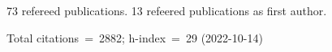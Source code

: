 73 refereed publications. 13 refeered publications as first author.

Total citations~=~2882; h-index~=~29 (2022-10-14)